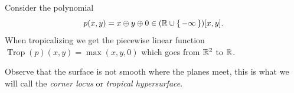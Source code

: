 \documentclass[12pt]{memoir}
\DeclareMathOperator{\Trop}{Trop}
\theoremstyle{definition}
\begin{document}
\begin{Ex}
    Consider the polynomial 
    $$p(x,y)=x\oplus y\oplus 0\in (\mathbb{R}\cup\{\,-\infty\,\})[x,y].$$
    When tropicalizing we get the piecewise linear function $\Trop(p)(x,y)=\max(x,y,0)$ which goes from $\mathbb{R}^2$ to $\mathbb{R}$.
    \begin{figure}[h!]
        \centering
        \quad
        \quad
        \label{fig:2.1-and-2.2-and-2.3}
    \end{figure}
    Observe that the surface is not smooth where the planes meet, this is what we will call the \emph{corner locus} or \emph{tropical hypersurface}.
\end{Ex}
\end{document}
